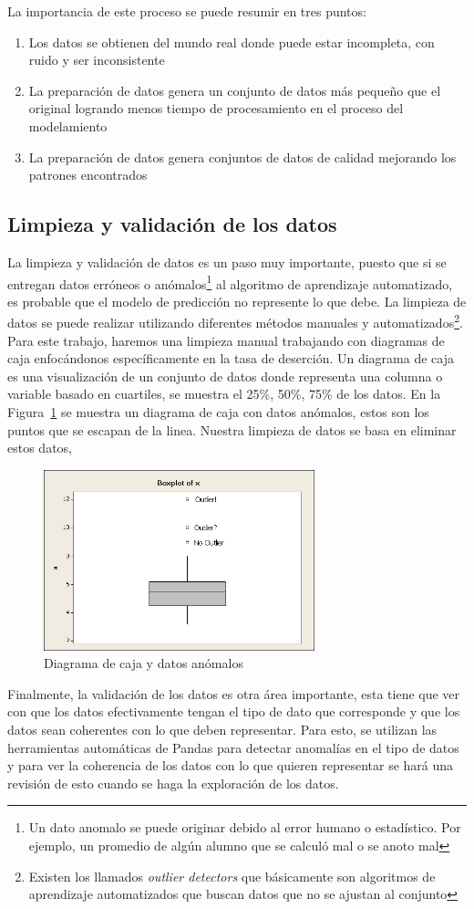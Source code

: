 La importancia de este proceso se puede resumir en tres puntos:\cite{dr.zdravkomarkov}
\begin{enumerate}
  \item Los datos se obtienen del mundo real donde puede estar incompleta, con ruido y ser inconsistente
  \item La preparación de datos genera un conjunto de datos más pequeño que el original logrando menos tiempo de procesamiento en el proceso del modelamiento
  \item La preparación de datos genera conjuntos de datos de calidad mejorando los patrones encontrados
\end{enumerate}
\subsection{Limpieza y validación de los datos}
La limpieza y validación de datos es un paso muy importante, puesto que si se entregan datos erróneos o anómalos\footnote{Un dato anomalo se puede originar debido al error humano o estadístico. Por ejemplo, un promedio de algún alumno que se calculó mal o se anoto mal } al algoritmo de aprendizaje automatizado, es probable que el modelo de predicción no represente lo que debe. La limpieza de datos se puede realizar utilizando diferentes métodos manuales y automatizados\footnote{Existen los llamados \textit{outlier detectors} que básicamente son algoritmos de aprendizaje automatizados que buscan datos que no se ajustan al conjunto}. Para este trabajo, haremos una limpieza manual trabajando con diagramas de caja enfocándonos específicamente en la tasa de deserción.
Un diagrama de caja es una visualización de un conjunto de datos donde representa una columna o variable basado en cuartiles, se muestra el 25\%, 50\%, 75\% de los datos.
En la Figura~\ref{fig:outlier} se muestra un diagrama de caja con datos anómalos, estos son los puntos que se escapan de la linea. Nuestra limpieza de datos se basa en eliminar estos datos,
\begin{figure}
  \centering
    \includegraphics[width=0.7\textwidth]{Figuras/outlier1}
      \caption{Diagrama de caja y datos anómalos\cite{outlier1}}
    \label{fig:outlier}
\end{figure}
Finalmente, la validación de los datos es otra área importante, esta tiene que ver con que los datos efectivamente tengan el tipo de dato que corresponde y que los datos sean coherentes con lo que deben representar. Para esto, se utilizan las herramientas automáticas de Pandas para detectar anomalías en el tipo de datos y para ver la coherencia de los datos con lo que quieren representar se hará una revisión de esto cuando se haga la exploración de los datos.
